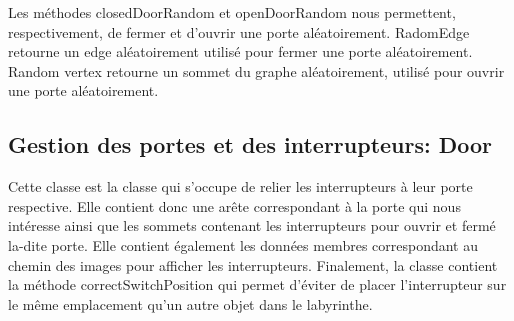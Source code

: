 \documentclass [10pt, a4paper]{article}
\begin{document}
Les méthodes closedDoorRandom et openDoorRandom nous permettent, respectivement, de fermer et d'ouvrir une porte aléatoirement. RadomEdge retourne un edge aléatoirement utilisé pour fermer une porte aléatoirement. Random vertex retourne un sommet du graphe aléatoirement, utilisé pour ouvrir une porte aléatoirement.

\subsection {Gestion des portes et des interrupteurs: Door}
Cette classe est la classe qui s'occupe de relier les interrupteurs à leur porte respective. Elle contient donc une arête correspondant à la porte qui nous intéresse ainsi que les sommets contenant les interrupteurs pour ouvrir et fermé la-dite porte. Elle contient également les données membres correspondant au chemin des images pour afficher les interrupteurs. Finalement, la classe contient la méthode correctSwitchPosition qui permet d'éviter de placer l'interrupteur sur le même emplacement qu'un autre objet dans le labyrinthe.
\end{document}
